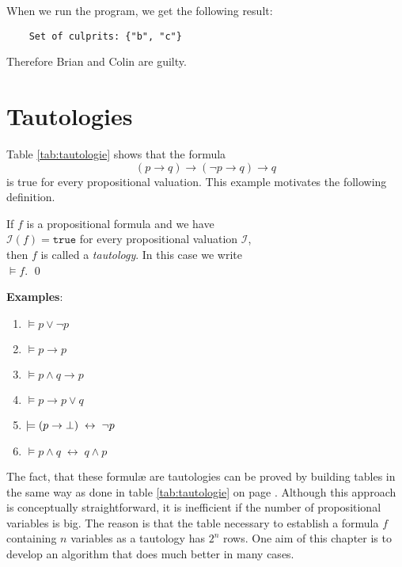 When we run the program, we get the following result:
\begin{verbatim}
    Set of culprits: {"b", "c"}
\end{verbatim}
Therefore Brian and Colin are guilty.
\pagebreak

\hspace*{\fill}
\pagebreak

\section{Tautologies}
Table  \ref{tab:tautologie} shows that the formula
$$  (p \rightarrow q) \rightarrow (\neg p \rightarrow q) \rightarrow q $$
is true for every propositional valuation.  This example motivates the following definition.

\begin{Definition}
If $f$ is a propositional formula and we have  \\[0.2cm]
\hspace*{1.3cm} 
$\mathcal{I}(f) = \mathtt{true}$ \quad for every propositional valuation $\mathcal{I}$, 
\\[0.2cm]
then $f$ is called a \emph{tautology}.  In this case we write \\[0.2cm]
\hspace*{1.3cm} $\models f$.
\qed
\end{Definition}


\noindent
\textbf{Examples}:
\begin{enumerate}
\item $\models p \vee \neg p$
\item $\models p \rightarrow p$
\item $\models p \wedge q \rightarrow p$
\item $\models p \rightarrow p \vee q$
\item $\models (p \rightarrow \bot) \;\leftrightarrow\; \neg p$
\item $\models p \wedge q \;\leftrightarrow\; q \wedge p$
\end{enumerate}
The fact, that these {formul\ae} are tautologies can be proved by building tables in the same
way as done in table \ref{tab:tautologie} on page \pageref{tab:tautologie}.  Although this
approach is conceptually straightforward, it is inefficient if the number of propositional
variables is big.  The reason is that the table necessary to establish a formula $f$ containing $n$
variables as a tautology has $2^n$ rows.  One aim of this chapter is to develop an
algorithm that does much better in many cases.

